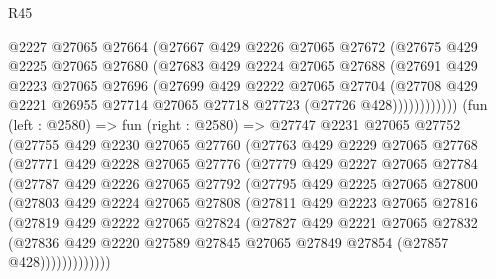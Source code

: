 \begin{lexlean}{R45}
\begin{coremodule}
              @2227
              @27065
              @27664
              (@27667
                @429
                @2226
                @27065
                @27672
                (@27675
                  @429
                  @2225
                  @27065
                  @27680
                  (@27683
                    @429
                    @2224
                    @27065
                    @27688
                    (@27691
                      @429
                      @2223
                      @27065
                      @27696
                      (@27699
                        @429
                        @2222
                        @27065
                        @27704
                        (@27708
                          @429
                          @2221
                          @26955
                          @27714
                          @27065
                          @27718
                          @27723
                          (@27726 @428))))))))))))
    (fun (left : @2580) =>
    fun (right : @2580) =>
    @27747
      @2231
      @27065
      @27752
      (@27755
        @429
        @2230
        @27065
        @27760
        (@27763
          @429
          @2229
          @27065
          @27768
          (@27771
            @429
            @2228
            @27065
            @27776
            (@27779
              @429
              @2227
              @27065
              @27784
              (@27787
                @429
                @2226
                @27065
                @27792
                (@27795
                  @429
                  @2225
                  @27065
                  @27800
                  (@27803
                    @429
                    @2224
                    @27065
                    @27808
                    (@27811
                      @429
                      @2223
                      @27065
                      @27816
                      (@27819
                        @429
                        @2222
                        @27065
                        @27824
                        (@27827
                          @429
                          @2221
                          @27065
                          @27832
                          (@27836
                            @429
                            @2220
                            @27589
                            @27845
                            @27065
                            @27849
                            @27854
                            (@27857 @428)))))))))))))

\end{coremodule}
\end{lexlean}
